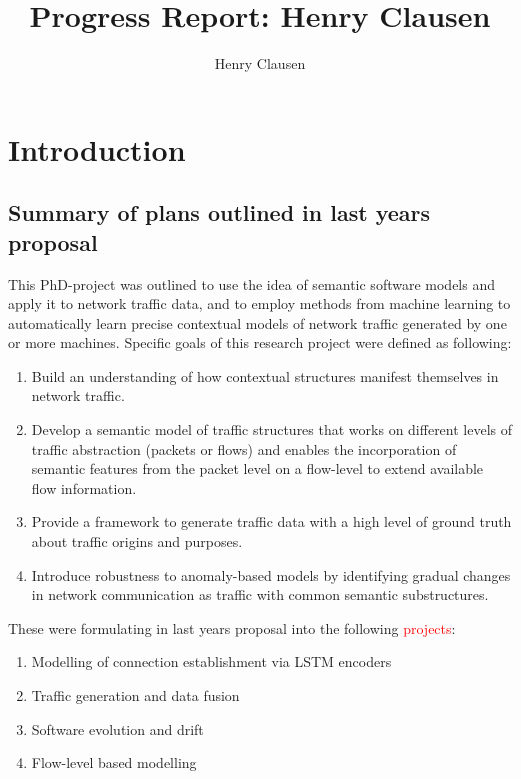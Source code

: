 \documentclass[a4paper,12pt,twoside]{article}
\makeatletter
\newcommand*{\toccontents}{\@starttoc{toc}}
\makeatother
\begin{document}
\title{\LARGE {\bf Progress Report: Henry Clausen}\\
 \vspace*{-5mm}
}
\author{Henry Clausen}

\maketitle



\toccontents


\section{Introduction}

\subsection{Summary of plans outlined in last years proposal}
This PhD-project was outlined to use the idea of semantic software models and apply it to network traffic data, and to employ methods from machine learning to automatically learn precise contextual models of network traffic generated by one or more machines. Specific goals of this research project were defined as following:
\begin{enumerate}

\item Build an understanding of how contextual structures manifest themselves in network traffic.
\item Develop a semantic model of traffic structures that works on different levels of traffic abstraction (packets or flows) and enables the incorporation of semantic features from the packet level on a flow-level to extend available flow information.
\item Provide a framework to generate traffic data with a high level of ground truth about traffic origins and purposes.
\item Introduce robustness to anomaly-based models by identifying gradual changes in network communication as traffic with common semantic substructures.

\end{enumerate}

These were formulating in last years proposal into the following \textcolor{red}{projects}:

\begin{enumerate}
\item Modelling of connection establishment via LSTM encoders
\item Traffic generation and data fusion 
\item Software evolution and drift 
\item Flow-level based modelling
\end{enumerate}
\end{document}
